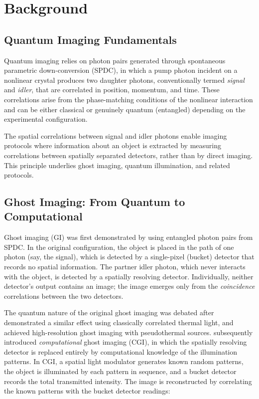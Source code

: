 \section{Background}
\label{sec:background}

\subsection{Quantum Imaging Fundamentals}

Quantum imaging relies on photon pairs generated through spontaneous parametric down-conversion (SPDC), in which a pump photon incident on a nonlinear crystal produces two daughter photons, conventionally termed \emph{signal} and \emph{idler}, that are correlated in position, momentum, and time. These correlations arise from the phase-matching conditions of the nonlinear interaction and can be either classical or genuinely quantum (entangled) depending on the experimental configuration.

The spatial correlations between signal and idler photons enable imaging protocols where information about an object is extracted by measuring correlations between spatially separated detectors, rather than by direct imaging. This principle underlies ghost imaging, quantum illumination, and related protocols.

\subsection{Ghost Imaging: From Quantum to Computational}

Ghost imaging (GI) was first demonstrated by \citet{pittman1995} using entangled photon pairs from SPDC. In the original configuration, the object is placed in the path of one photon (say, the signal), which is detected by a single-pixel (bucket) detector that records no spatial information. The partner idler photon, which never interacts with the object, is detected by a spatially resolving detector. Individually, neither detector's output contains an image; the image emerges only from the \emph{coincidence} correlations between the two detectors.

The quantum nature of the original ghost imaging was debated after \citet{bennink2002} demonstrated a similar effect using classically correlated thermal light, and \citet{ferri2005} achieved high-resolution ghost imaging with pseudothermal sources. \citet{shapiro2008} subsequently introduced \emph{computational} ghost imaging (CGI), in which the spatially resolving detector is replaced entirely by computational knowledge of the illumination patterns. In CGI, a spatial light modulator generates known random patterns, the object is illuminated by each pattern in sequence, and a bucket detector records the total transmitted intensity. The image is reconstructed by correlating the known patterns with the bucket detector readings:

